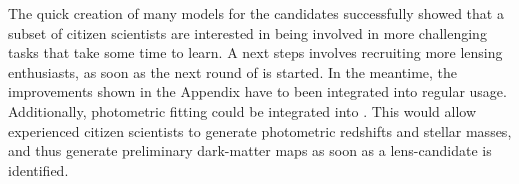The quick creation of many models for the {\SW} candidates successfully showed 
that a subset of citizen scientists are interested in being involved in more 
challenging tasks that take some time to learn. A next steps involves 
recruiting more lensing enthusiasts, as soon as the next round of {\SW} is 
started. In the meantime, the improvements shown in the Appendix have to been 
integrated into regular {\SpL} usage. Additionally, photometric fitting could 
be integrated into {\SpL}. This would allow experienced citizen scientists to 
generate photometric redshifts and stellar masses, and thus generate 
preliminary dark-matter maps as soon as a lens-candidate is identified.


